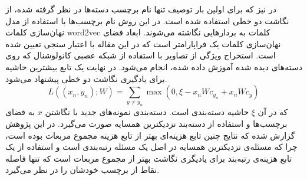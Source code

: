در 
\cite{devise}
نیز که برای اولین بار توصیف تنها نام برچسب دسته‌ها در نظر گرفته شده، از نگاشت دو خطی استفاده شده است. در این روش نام برچسب‌ها با استفاده از مدل نهان‌سازی کلمات word2vec
\cite{word2vec}
کلمات به بردارهایی نگاشته می‌شوند. ابعاد فضای نهان‌سازی کلمات یک فراپارامتر است که در این مقاله با اعتبار سنجی تعیین شده است. استخراج ویژگی از  تصاویر  با استفاده از شبکه عصبی کانولوشنال 
\cite{alexnet}
که روی دسته‌های دیده شده آموزش داده شده، انجام می‌شود. در نهایت یک تابع بیشترین حاشیه
برای یادگیری نگاشت دو خطی پیشنهاد می‌شود.
\begin{equation}
 L((x_n, y_n);W) = \sum_{y\neq y_n} \max(0, \xi  - x_nWc_{y_n} + x_nWc_y) 
\end{equation}
که در آن $\xi$ حاشیه دسته‌بندی است. دسته‌بندی نمونه‌های جدید با نگاشتن $x$ به فضای برچسب‌ها و استفاده از دسته‌بند نزدیکترین همسایه صورت می‌گیرد. 
 در این پژوهش گزارش شده که نتایج چنین تابع هزینه‌ای بهتر از تابع هزینه مجموع مربعات بوده است، چرا که مسئله‌ی نزدیکترین همسایه در اصل یک مسئله رتبه‌بندی
 است و استفاده از یک تابع هزینه‌ی رتبه‌بند برای یادیگری نگاشت بهتر از مجموع مربعات است که تنها فاصله نقاط از برچسب خودشان را در نظر می‌گیرد. 
 
 
 
 

